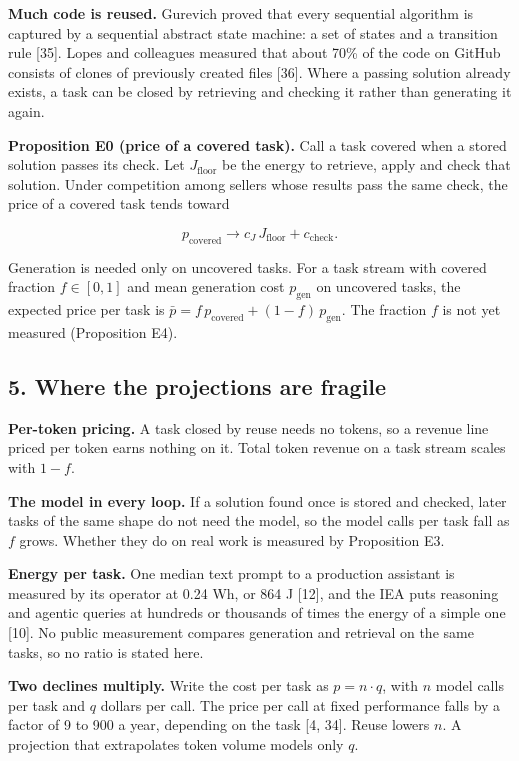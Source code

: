 \documentclass[
  10pt,
]{article}
\begin{document}
\textbf{Much code is reused.} Gurevich proved that every sequential
algorithm is captured by a sequential abstract state machine: a set of
states and a transition rule {[}35{]}. Lopes and colleagues measured
that about 70\% of the code on GitHub consists of clones of previously
created files {[}36{]}. Where a passing solution already exists, a task
can be closed by retrieving and checking it rather than generating it
again.

\textbf{Proposition E0 (price of a covered task).} Call a task covered
when a stored solution passes its check. Let \(J_{\text{floor}}\) be the
energy to retrieve, apply and check that solution. Under competition
among sellers whose results pass the same check, the price of a covered
task tends toward

\[p_{\text{covered}} \to c_J \, J_{\text{floor}} + c_{\text{check}}.\]

Generation is needed only on uncovered tasks. For a task stream with
covered fraction \(f \in [0, 1]\) and mean generation cost
\(p_{\text{gen}}\) on uncovered tasks, the expected price per task is
\(\bar p = f \, p_{\text{covered}} + (1 - f) \, p_{\text{gen}}\). The
fraction \(f\) is not yet measured (Proposition E4).

\subsection{5. Where the projections are
fragile}\label{where-the-projections-are-fragile}

\textbf{Per-token pricing.} A task closed by reuse needs no tokens, so a
revenue line priced per token earns nothing on it. Total token revenue
on a task stream scales with \(1 - f\).

\textbf{The model in every loop.} If a solution found once is stored and
checked, later tasks of the same shape do not need the model, so the
model calls per task fall as \(f\) grows. Whether they do on real work
is measured by Proposition E3.

\textbf{Energy per task.} One median text prompt to a production
assistant is measured by its operator at 0.24 Wh, or 864 J {[}12{]}, and
the IEA puts reasoning and agentic queries at hundreds or thousands of
times the energy of a simple one {[}10{]}. No public measurement
compares generation and retrieval on the same tasks, so no ratio is
stated here.

\textbf{Two declines multiply.} Write the cost per task as
\(p = n \cdot q\), with \(n\) model calls per task and \(q\) dollars per
call. The price per call at fixed performance falls by a factor of 9 to
900 a year, depending on the task {[}4, 34{]}. Reuse lowers \(n\). A
projection that extrapolates token volume models only \(q\).
\end{document}
